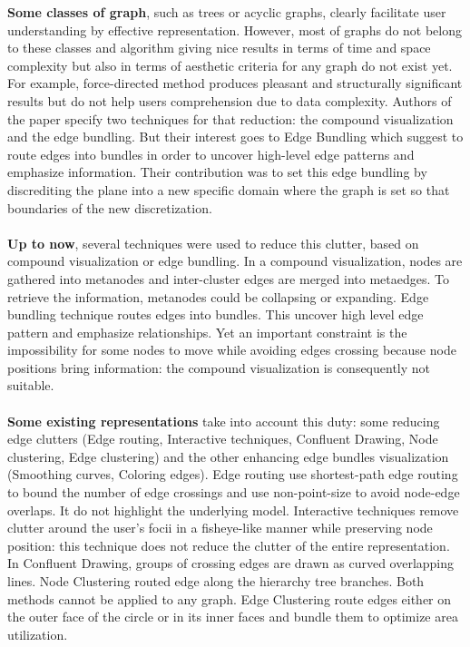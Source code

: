 \textbf{Some classes of graph}, such as trees or acyclic graphs, clearly facilitate user understanding by effective representation. However, most of graphs do not belong to these classes and algorithm giving nice results in terms of time and space complexity but also in terms of aesthetic criteria for any graph do not exist yet. For example, force-directed method produces pleasant and structurally significant results but do not help users comprehension due to data complexity. Authors of the paper specify two techniques for that reduction: the compound visualization and the edge bundling. But their interest goes to Edge Bundling which suggest to route edges into bundles in order to uncover high-level edge patterns and emphasize information. Their contribution was to set this edge bundling by discrediting the plane into a new specific domain where the graph is set so that boundaries of the new discretization.
\\
\\
\textbf{Up to now}, several techniques were used to reduce this clutter, based on compound visualization or edge bundling. In a compound visualization, nodes are gathered into metanodes and inter-cluster edges are merged into metaedges. To retrieve the information, metanodes could be collapsing or expanding. Edge bundling technique routes edges into bundles. This uncover high level edge pattern and emphasize relationships.
Yet an important constraint is the impossibility for some nodes to move while avoiding edges crossing because node positions bring information: the compound visualization is consequently not suitable.
\\
\\
\textbf{Some existing representations} take into account this duty: some reducing edge clutters (Edge routing, Interactive techniques, Confluent Drawing, Node clustering, Edge clustering) and the other enhancing edge bundles visualization (Smoothing curves, Coloring edges). Edge routing use shortest-path edge routing to bound the number of edge crossings and use non-point-size to avoid node-edge overlaps. It do not highlight the underlying model. Interactive techniques remove clutter around the user’s focii in a fisheye-like manner while preserving node position: this technique does not reduce the clutter of the entire representation. In Confluent Drawing, groups of crossing edges are drawn as curved overlapping lines. Node Clustering routed edge along the hierarchy tree branches. Both methods cannot be applied to any graph.
Edge Clustering route edges either on the outer face of the circle or in its inner faces and bundle them to optimize area utilization.
